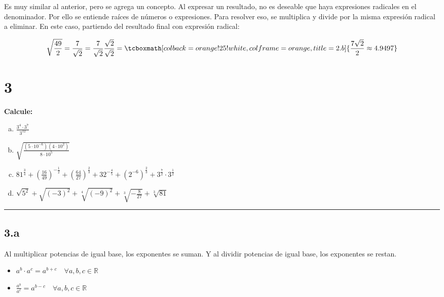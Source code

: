 \documentclass{article}
\begin{document}
Es muy similar al anterior, pero se agrega un concepto. Al expresar un resultado, no es deseable que haya expresiones radicales en el denominador. Por ello se entiende raíces de números o expresiones. Para resolver eso, se multiplica y divide por la misma expresión radical a eliminar. En este caso, partiendo del resultado final con expresión radical:

\begin{equation}
\sqrt{\frac{49}{2}} = \frac{7}{\sqrt{2}} = \frac{7}{\sqrt{2}} \frac{\sqrt{2}}{\sqrt{2}} = \tcboxmath[colback=orange!25!white,colframe=orange, title=2.b] { \frac{7 \sqrt{2}}{2} \approx 4.9497 }
\end{equation}

\section*{3}
\label{sec:3}

\textbf{Calcule:}

\begin{enumerate}[(a)]
\bfseries

\item $ \frac{3^4 \cdot 3^7}{3^{12}} $

\item $\sqrt{ \frac{ (5 \cdot 10^{-6}) (4 \cdot {10}^2) }{8 \cdot {10}^5} }$

\item $ {81}^{\frac{3}{4}} + \left( \frac{16}{49} \right)^{-\frac{1}{2}} + \left( \frac{64}{27} \right)^{\frac{2}{3}} + {32}^{-\frac{4}{5}} + \left( {{2}^{-6}} \right) ^{\frac{2}{3}} + 3^{\frac{7}{2}} \cdot 3^{\frac{1}{2}} $

\item $ \sqrt{5^2} + \sqrt{(-3)^2} + \sqrt[4]{(-9)^2} + \sqrt[3]{-\frac{8}{27}} + \sqrt[3]{81} $

\end{enumerate}
\hrule

\subsection*{3.a}
\label{subsec:3.a}

Al multiplicar potencias de igual base, los exponentes se suman. Y al dividir potencias de igual base, los exponentes se restan.

\begin{itemize}
\item $ a^b \cdot a^c = a^{b + c} \quad \forall a, b, c \in \mathbb{R}$
\item $ \frac{a^b}{a^c} = a^{b - c} \quad \forall a, b, c \in \mathbb{R}$
\end{itemize}
\end{document}
